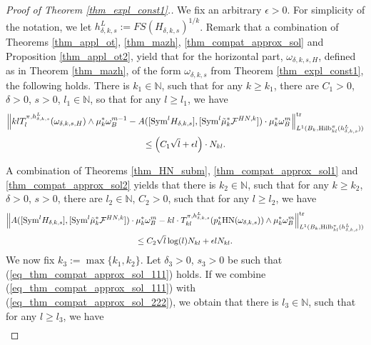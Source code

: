 \documentclass[12pt]{article}
\numberwithin{equation}{section}
\theoremstyle{theorem}
\theoremstyle{definition}
\theoremstyle{remark}
\newcommand{\nat}{\mathbb{N}}
\begin{document}
	
	\begin{proof}[Proof of Theorem \ref{thm_expl_const1}.]
		We fix an arbitrary $\epsilon > 0$.
		For simplicity of the notation, we let $h^L_{\delta, k, s} := FS(H_{\delta, k, s})^{1/k}$.
		Remark that a combination of Theorems \ref{thm_appl_ot}, \ref{thm_mazh}, \ref{thm_compat_approx_sol} and Proposition \ref{thm_appl_ot2}, yield that for the horizontal part, $\omega_{\delta, k, s, H}$, defined as in Theorem \ref{thm_mazh}, of the form $\omega_{\delta, k, s}$ from Theorem \ref{thm_expl_const1}, the following holds.
		There is $k_1 \in \nat$, such that for any $k \geq k_1$, there are $C_1 > 0$, $\delta > 0$, $s > 0$, $l_1 \in \nat$, so that for any $l \geq l_1$, we have
		\begin{multline}\label{eq_thm_compat_approx_sol_111}
			\Big\|
				kl T_l^{\pi, h^L_{\delta, k, s}}(\omega_{\delta, k, s, H})
				\wedge
				\mu_k^* \omega_B^{m - 1}
				-
				A([{\rm{Sym}}^l H_{\delta, k, s}], [{\rm{Sym}}^l \tilde{\mu}_k^* \mathcal{F}^{HN, k}])
				\cdot
				\mu_k^* \omega_B^m
			\Big\|_{L^1(B_k, {\textrm{Hilb}}^{\pi}_{kl}(h^L_{\delta, k, s}))}^{{\rm{tr}}}
			\\
			\leq
			\Big( C_1 \sqrt{l} + \epsilon l \Big) \cdot N_{kl}.
		\end{multline}
		\par 
		A combination of Theorems \ref{thm_HN_subm}, \ref{thm_compat_approx_sol1} and \ref{thm_compat_approx_sol2} yields that there is $k_2 \in \nat$, such that for any $k \geq k_2$, $\delta > 0$, $s > 0$, there are $l_2 \in \nat$, $C_2 > 0$, such that for any $l \geq l_2$, we have
		\begin{multline}\label{eq_thm_compat_approx_sol_222}
			\Big\|
				A([{\rm{Sym}}^l H_{\delta, k, s}], [{\rm{Sym}}^l \tilde{\mu}_k^* \mathcal{F}^{HN, k}])
				\cdot
				\mu_k^* \omega_B^m
				-
				kl
				\cdot
				T_{kl}^{\pi, h^L_{\delta, k, s}}(p_k^* {\rm{HN}}(\omega_{\delta, k, s}))
				\wedge
				\mu_k^* \omega_B^m
			\Big\|_{L^1(B_k, {\textrm{Hilb}}^{\pi}_{kl}(h^L_{\delta, k, s}))}^{{\rm{tr}}}
			\\
			\leq
			C_2 \sqrt{l} \log(l)  N_{kl} + \epsilon l N_{kl}.
		\end{multline}
		We now fix $k_3 := \max\{ k_1, k_2\}$. 
		Let $\delta_3 > 0$, $s_3 > 0$ be such that (\ref{eq_thm_compat_approx_sol_111}) holds.
		If we combine (\ref{eq_thm_compat_approx_sol_111}) with (\ref{eq_thm_compat_approx_sol_222}), we obtain that there is $l_3 \in \nat$, such that for any $l \geq l_3$, we have
		\begin{multline}\label{eq_thm_compat_approx_sol_333}

\end{multline}
\end{proof}
\end{document}
